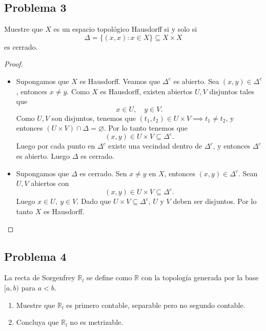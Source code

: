 \documentclass{article}
\theoremstyle{definition}
\theoremstyle{remark}
\numberwithin{equation}{section}
\newcommand{\R}{\mathbb{R}}
\begin{document}
\subsection{Problema 3}
Muestre que $X$ es un espacio topológico Hausdorff si y solo si $$\Delta = \{(x,x) \colon x \in X\} \subseteq X \times X$$ es cerrado.
\begin{proof}
  \
  \begin{itemize}
    \item [\boxed{\implies}]
    Supongamos que $X$ es Hausdorff. Veamos que $\Delta^c$ es abierto.
    Sea $(x,y) \in \Delta^c$, entonces $x \neq y$. Como $X$ es Hausdorff, existen abiertos $U,V$ disjuntos tales que
    \[x \in U, \quad y \in V.\]
    Como $U,V$ son disjuntos, tenemos que $(t_1,t_2) \in U \times V \implies t_1 \neq t_2$, y entonces $(U \times V) \cap \Delta = \varnothing$. Por lo tanto tenemos que $$(x,y) \in U \times V \subseteq \Delta^c.$$
    Luego por cada punto en $\Delta^c$ existe una vecindad dentro de $\Delta^c$, y entonces $\Delta^c$ es abierto. Luego $\Delta$ es cerrado.

    \item [\boxed{\impliedby}]
    Supongamos que $\Delta$ es cerrado. Sen $x \neq y$ en $X$, entonces $(x,y) \in \Delta^c$. Sean $U,V$ abiertos con $$(x,y) \in U \times V \subseteq \Delta^c.$$
    Luego $x \in U, \ y \in V$. Dado que $U \times V \subseteq \Delta^c$, $U$ y $V$ deben ser disjuntos. Por lo tanto $X$ es Hausdorff.
  \end{itemize}
\end{proof}

\newpage
\subsection{Problema 4}
La recta de Sorgenfrey $\R_l$ se define como $\R$ con la topología generada por la base $[a,b)$ para $a<b$.
\begin{enumerate}
  \item Muestre que $\R_l$ es primero contable, separable pero no segundo contable.
  \item Concluya que $\R_l$ no es metrizable.
\end{enumerate}

\newpage
\end{document}
